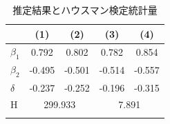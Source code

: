 \begin{table}[t]
\begin{minipage}{\textwidth}
\centering
\def\sym#1{\ifmmode^{#1}\else\(^{#1}\)\fi}
\caption{推定結果とハウスマン検定統計量}
\begin{tabular}{l*{4}{c}}
\hline\hline
            &\multicolumn{1}{c}{(1)}&\multicolumn{1}{c}{(2)}&\multicolumn{1}{c}{(3)}&\multicolumn{1}{c}{(4)}\\
\hline
$\beta_1$&        0.792         &       0.802        &      0.782  &     0.854  \\
[1em]
$\beta_2$      &         -0.495          &       -0.501        &       -0.514        &       -0.557         \\
[1em]
$\delta$&        -0.237         &       -0.252        &       -0.196         &       -0.315        \\
\hline
H      &        \multicolumn{2}{c}{299.933}       &         \multicolumn{2}{c}{7.891}        \\
\hline\hline\\
\end{tabular}
\end{minipage}
\end{table}